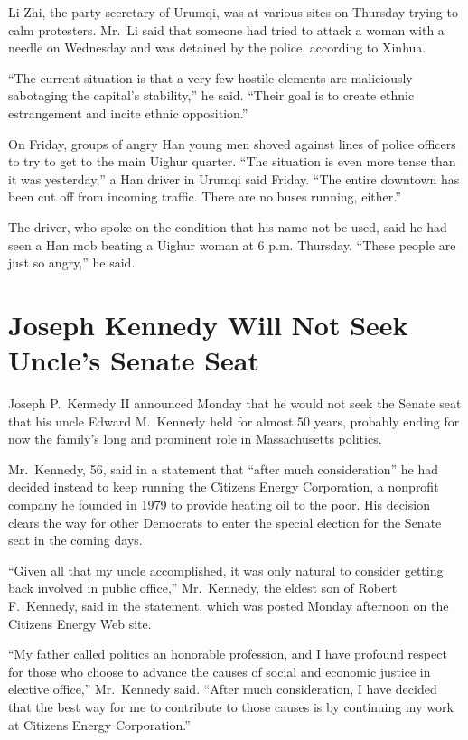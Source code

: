﻿\documentclass[12pt]{article}
\begin{document}
Li Zhi, the party secretary of Urumqi, was at various sites on Thursday trying to calm protesters.
Mr.~Li said that someone had tried to attack a woman with a needle on Wednesday and was detained by
the police, according to Xinhua.

``The current situation is that a very few hostile elements are maliciously sabotaging the capital's
stability,'' he said. ``Their goal is to create ethnic estrangement and incite ethnic opposition.''

On Friday, groups of angry Han young men shoved against lines of police officers to try to get to
the main Uighur quarter. ``The situation is even more tense than it was yesterday,'' a Han driver in
Urumqi said Friday. ``The entire downtown has been cut off from incoming traffic. There are no buses
running, either.''

The driver, who spoke on the condition that his name not be used, said he had seen a Han mob beating
a Uighur woman at 6 p.m. Thursday. ``These people are just so angry,'' he said.

\section{Joseph Kennedy Will Not Seek Uncle's Senate Seat}

Joseph P.~Kennedy II announced Monday that he would not seek the Senate seat that his uncle Edward
M.~Kennedy held for almost 50 years, probably ending for now the family's long and prominent role in
Massachusetts politics.

Mr.~Kennedy, 56, said in a statement that ``after much consideration'' he had decided instead to
keep running the Citizens Energy Corporation, a nonprofit company he founded in 1979 to provide
heating oil to the poor. His decision clears the way for other Democrats to enter the special
election for the Senate seat in the coming days.

``Given all that my uncle accomplished, it was only natural to consider getting back involved in
public office,'' Mr.~Kennedy, the eldest son of Robert F.~Kennedy, said in the statement, which was
posted Monday afternoon on the Citizens Energy Web site.

``My father called politics an honorable profession, and I have profound respect for those who
choose to advance the causes of social and economic justice in elective office,'' Mr.~Kennedy said.
``After much consideration, I have decided that the best way for me to contribute to those causes is
by continuing my work at Citizens Energy Corporation.''
\end{document}
